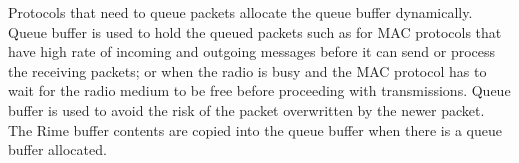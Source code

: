Protocols that need to queue packets allocate the queue buffer dynamically. Queue buffer is used to hold the queued packets such as for MAC protocols that have high rate of incoming and outgoing messages before it can send or process the receiving packets; or when the radio is busy and the MAC protocol has to wait for the radio medium to be free before proceeding with transmissions. Queue buffer is used to avoid the risk of the packet overwritten by the newer packet. The Rime buffer contents are copied into the queue buffer when there is a queue buffer allocated.











